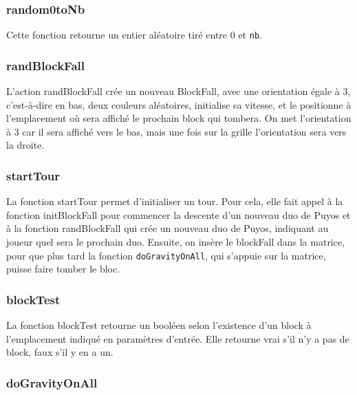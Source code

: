 \documentclass[11pt, final]{report}
\renewcommand{\tt}[1]{\texttt{#1}}
\begin{document}
\subsubsection{random0toNb}


Cette fonction retourne un entier aléatoire tiré entre 0 et \tt{nb}. 
\\

\subsubsection{randBlockFall}


L’action randBlockFall crée un nouveau BlockFall, avec une orientation égale à 3, c’est-à-dire en bas, deux couleurs aléatoires, initialise sa vitesse, et le positionne à l’emplacement où sera affiché le prochain block qui tombera. On met l'orientation à 3 car il sera affiché vers le bas, mais une fois sur la grille l'orientation sera vers la droite. 
\\

\subsubsection{startTour}


La fonction startTour permet d’initialiser un tour. Pour cela, elle fait appel à la fonction initBlockFall pour commencer la descente d'un nouveau duo de Puyos et à la fonction randBlockFall qui crée un nouveau duo de Puyos, indiquant au joueur quel sera le prochain duo. Ensuite, on insère le blockFall dans la matrice, pour que plus tard la fonction \tt{doGravityOnAll}, qui s'appuie sur la matrice, puisse faire tomber le bloc.
\\

\subsubsection{blockTest}


La fonction blockTest retourne un booléen selon l’existence d’un block à l’emplacement indiqué en paramètres d'entrée. Elle retourne vrai s'il n'y a pas de block, faux s'il y en a un.
\\

\subsubsection{doGravityOnAll}

\end{document}
